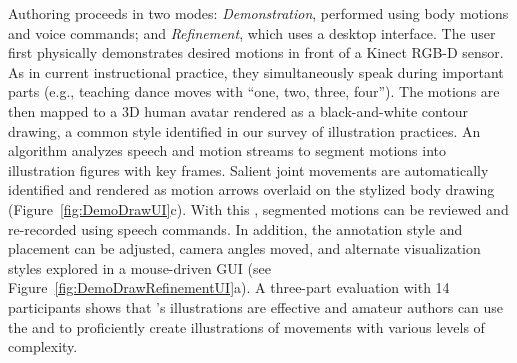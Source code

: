 Authoring proceeds in two modes: {\em Demonstration}, performed using body motions and voice commands; and {\em Refinement}, which uses a desktop interface.
%
The user first physically demonstrates desired motions in front of a Kinect RGB-D sensor. As in current instructional practice, they simultaneously speak during important parts (e.g., teaching dance moves with ``one, two, three, four'').
The motions are then mapped to a 3D human avatar rendered as a black-and-white contour drawing, a common style identified in our survey of illustration practices.
%
An algorithm analyzes speech and motion streams to segment motions into illustration figures with key frames. Salient joint movements are automatically identified and rendered as motion arrows overlaid on the stylized body drawing (Figure~\ref{fig:DemoDrawUI}c).
%
With this {\em \phaseI{}}, segmented motions can be reviewed and re-recorded using speech commands.
In addition, the annotation style and placement can be adjusted, camera angles moved, and alternate visualization styles explored in a mouse-driven GUI \emph{\phaseII{}} (see Figure~\ref{fig:DemoDrawRefinementUI}a).
%
A three-part evaluation with 14 participants shows that \systemname{}'s illustrations are effective and amateur authors can use the \phaseI{} and \phaseII{} to proficiently create illustrations of movements with various levels of complexity.

